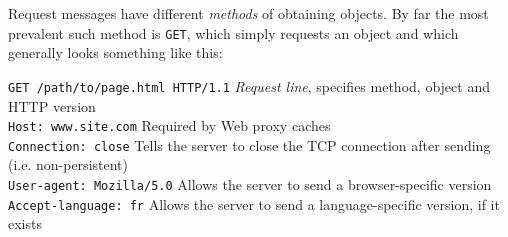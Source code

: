 \documentclass[table, xcdraw]{article}%
\begin{document}
Request messages have different \emph{methods} of obtaining objects. By far the most prevalent such method is \texttt{GET}, which simply requests an object and which generally looks something like this:

\texttt{GET /path/to/page.html HTTP/1.1} \emph{Request line}, specifies method, object and HTTP version\\
\texttt{Host: www.site.com} Required by Web proxy caches\\
\texttt{Connection: close} Tells the server to close the TCP connection after sending (i.e. non-persistent)\\
\texttt{User-agent: Mozilla/5.0} Allows the server to send a browser-specific version\\
\texttt{Accept-language: fr} Allows the server to send a language-specific version, if it exists
\end{document}
